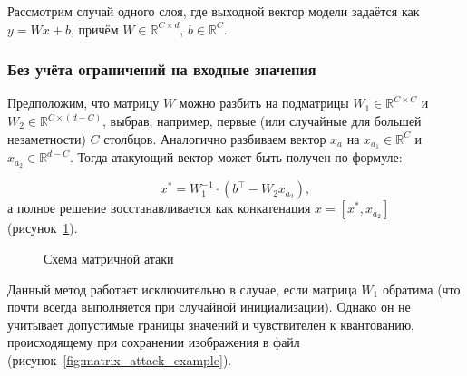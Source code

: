 Рассмотрим случай одного слоя, где выходной вектор модели задаётся как \(y = Wx + b\), причём \(W \in \mathbb{R}^{C \times d} \), \(b \in \mathbb{R}^C\).

\subsubsection{Без учёта ограничений на входные значения}

Предположим, что матрицу \(W\) можно разбить на подматрицы \(W_1 \in \mathbb{R}^{C \times C}\) и \(W_2 \in \mathbb{R}^{C \times (d - C)}\), выбрав, например, первые (или случайные для большей незаметности) \(C\) столбцов. Аналогично разбиваем вектор \(x_a\) на \(x_{a_1} \in \mathbb{R}^C\) и \(x_{a_2} \in \mathbb{R}^{d - C}\). Тогда атакующий вектор может быть получен по формуле:

\[
x^* = W_1^{-1} \cdot (b^\top - W_2 x_{a_2}),
\]
а полное решение восстанавливается как конкатенация \(x = [x^*, x_{a_2}]\) (рисунок~\cref{fig:matrix_attack}).

\begin{figure}[ht]
    \caption{Схема матричной атаки}
    \label{fig:matrix_attack}
\end{figure}

Данный метод работает исключительно в случае, если матрица \(W_1\) обратима (что почти всегда выполняется при случайной инициализации). Однако он не учитывает допустимые границы значений и чувствителен к квантованию, происходящему при сохранении изображения в файл (рисунок~\cref{fig:matrix_attack_example}).


